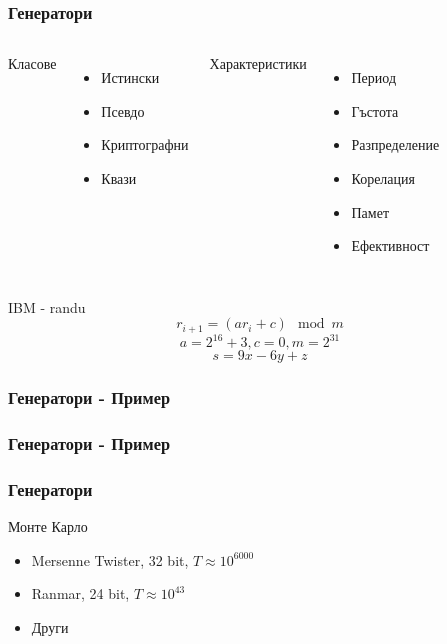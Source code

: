 
\begin{frame}
  \frametitle{Генератори}
\begin{columns}
  Класове
  \begin{itemize}
   \item Истински \pause
   \item Псевдо \pause
   \item Криптографни \pause
   \item Квази \pause
  \end{itemize}
  Характеристики
  \begin{itemize}
  \item Период\pause
  \item Гъстота \pause
  \item Разпределение \pause
  \item Корелация \pause
  \item Памет \pause
  \item Ефективност
  \end{itemize}
\end{columns}
\end{frame}

\begin{frame}
  IBM - randu
  \begin{equation*}
   r_{i+1} = (a r_i + c) \mod m 
  \end{equation*} 
  \pause
  \begin{equation*}
  a = 2^{16} + 3, c = 0, m = 2^{31}
  \end{equation*} 
  \pause
  \begin{equation*}
  s = 9 x - 6 y + z
  \end{equation*}
\end{frame}

\begin{frame}
  \frametitle{Генератори - Пример}
  \begin{figure}[t]
  \end{figure}
\end{frame}
\begin{frame}
  \frametitle{Генератори - Пример}
  \begin{figure}[t]
  \end{figure}
\end{frame}


\begin{frame}
  \frametitle{Генератори}
  Монте Карло
  \begin{itemize}
   \item Mersenne Twister, 32 bit, $T \approx 10^{6000} $ \pause
   \item Ranmar, 24 bit, $T \approx 10^{43} $ \pause
   \item Други
  \end{itemize}
\end{frame}
